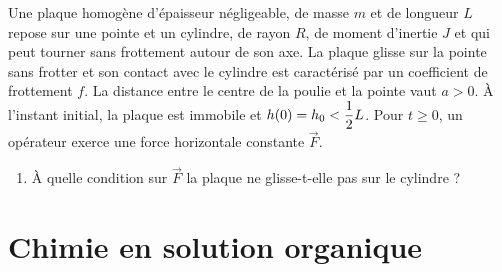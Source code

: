 \documentclass[a4paper,french,bookmarks]{book}
\begin{document}
    \begin{minipage}{0.48\linewidth}
        Une plaque homogène d'épaisseur négligeable, de masse $m$ et de longueur $L$ repose sur une pointe et un cylindre, de rayon $R$, de moment d'inertie $J$ et qui peut tourner sans frottement autour de son axe. La plaque glisse sur la pointe sans frotter et son contact avec le cylindre est caractérisé par un coefficient de frottement $f$. La distance entre le centre de la poulie et la pointe vaut $a > 0$. À l'instant initial, la plaque est immobile et $h\!\left(0\right) = h_0 < \dfrac{1}{2}L$. Pour $t \geq 0$, un opérateur exerce une force horizontale constante $\vec{F}$. 
    \end{minipage}
    \hfill
    \begin{minipage}{0.5\linewidth}
        \centering
    \end{minipage}
    
    \begin{enumerate}
        \item À quelle condition sur $\vec{F}$ la plaque ne glisse-t-elle pas sur le cylindre ?
        
    \end{enumerate}
    
    
    \chapter{Chimie en solution organique}
    
\end{document}
